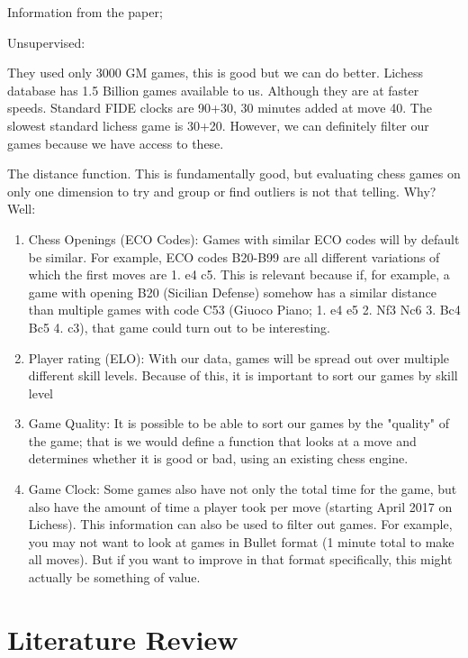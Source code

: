 \documentclass[12pt]{article}
\begin{document}
    Information from the paper;

    Unsupervised:

        They used only 3000 GM games, this is good but we can do better. Lichess database has 1.5 Billion games available to us. Although they are at faster speeds. Standard FIDE clocks are 90+30, 30 minutes added at move 40. The slowest standard lichess game is 30+20. However, we can definitely filter our games because we have access to these. 

        The distance function. This is fundamentally good, but evaluating chess games on only one dimension to try and group or find outliers is not that telling. Why? Well:

        \begin{enumerate}
            \item Chess Openings (ECO Codes): Games with similar ECO codes will by default be similar. For example, ECO codes B20-B99 are all different variations of which the first moves are 1. e4 c5. This is relevant because if, for example, a game with opening B20 (Sicilian Defense) somehow has a similar distance than multiple games with code C53 (Giuoco Piano; 1. e4 e5 2. Nf3 Nc6 3. Bc4 Bc5 4. c3), that game could turn out to be interesting. 
            \item Player rating (ELO): With our data, games will be spread out over multiple different skill levels. Because of this, it is important to sort our games by skill level 
            \item Game Quality: It is possible to be able to sort our games by the "quality" of the game; that is we would define a function that looks at a move and determines whether it is good or bad, using an existing chess engine. 
            \item Game Clock: Some games also have not only the total time for the game, but also have the amount of time a player took per move (starting April 2017 on Lichess). This information can also be used to filter out games. For example, you may not want to look at games in Bullet format (1 minute total to make all moves). But if you want to improve in that format specifically, this might actually be something of value.
        \end{enumerate}

    \section{Literature Review}
\end{document}

